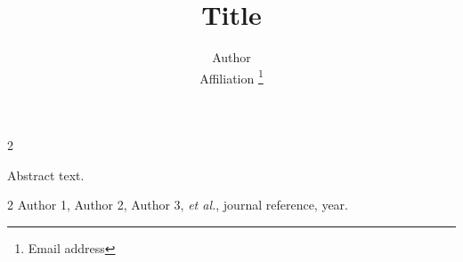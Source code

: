 \documentclass[a4paper,11pt]{article}
\title{Title}
\author{
  Author\\
  Affiliation
  \thanks{Email address}
}
\date{}
\begin{document}
\pagestyle{empty}
\maketitle

\begin{multicols}{2}

Abstract text.\cite{reference}

\small
\renewcommand{\refname}{\vspace{-2em}}
\begin{thebibliography}{2}
    Author 1, Author 2, Author 3, \emph{et al.}, journal reference, year.
\end{thebibliography}

\end{multicols}
\end{document}
